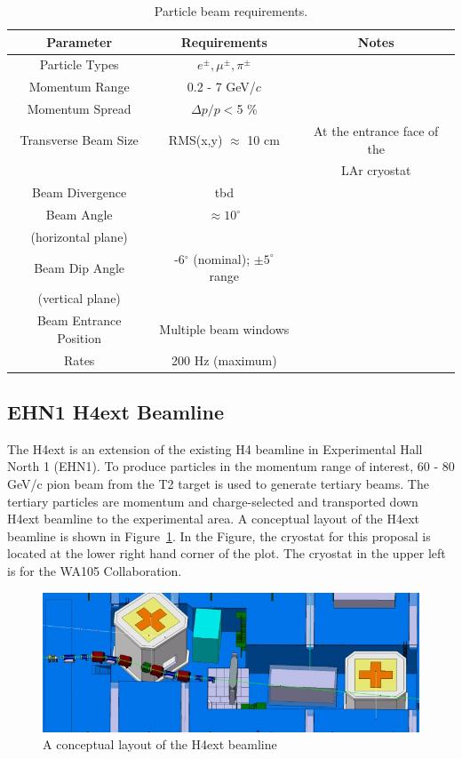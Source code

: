 \begin{table}[h]
\centering
\caption{Particle beam requirements.}
\label{table:beamspecs}
\begin{tabular}{|c|c|c|}
\hline
\textbf{Parameter } & \textbf{Requirements} & \textbf{Notes}  \\ \hline
  Particle Types        & $e^\pm,\mu^\pm,\pi^\pm$          &                   \\ \hline
  Momentum Range   & 0.2 - 7 GeV/$c$  &   \\ \hline
  Momentum Spread   & $\Delta p/p  < $5 \%  &   \\ \hline
  Transverse Beam Size   & RMS(x,y) $\approx$ 10 cm &  At the entrance face of the \\ 
                                              &                                        & LAr cryostat \\ \hline
  Beam Divergence & tbd  &   \\ \hline
  Beam Angle &  $\approx10^{\circ}$  &   \\
  (horizontal plane) & & \\ \hline
  Beam Dip Angle &  -6$^\circ$ (nominal); $\pm5^\circ$ range &   \\ 
  (vertical plane) & & \\ \hline
  Beam Entrance Position & Multiple beam windows  &   \\ \hline
  Rates & 200 Hz (maximum)  &   \\ \hline
\end{tabular}
\end{table}

\subsection{EHN1 H4ext Beamline}
The H4ext is an extension of the existing H4 beamline in Experimental Hall North 1 (EHN1).  To produce particles in the momentum range of interest, 60 - 80 GeV/c pion beam from the T2 target is used to generate tertiary beams. The tertiary particles are momentum and charge-selected and transported down H4ext beamline to the experimental area. A conceptual layout of the H4ext beamline is shown in Figure~\ref{fig:H4extPrelim}.  In the Figure, the cryostat for this proposal is located at the lower right hand corner of the plot. The cryostat in the upper left is for the WA105 Collaboration.

\begin{figure}[h]
  \centering
\includegraphics[scale=0.7]{figures/EHN1Ext_Prelim.jpg}
  \caption{A conceptual layout of the H4ext beamline  }
  \label{fig:H4extPrelim}
\end{figure}

